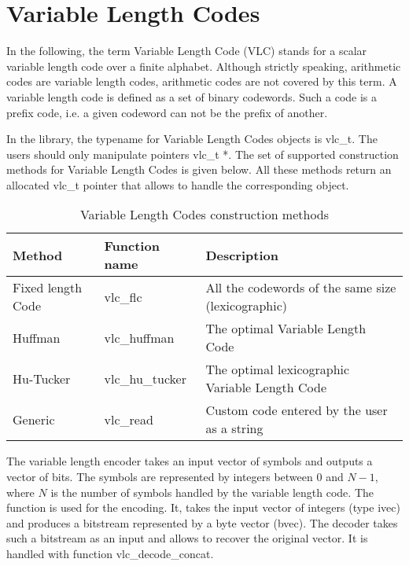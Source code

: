 \section{Variable Length Codes}

In the following, the term Variable Length Code (VLC)
stands for a scalar variable length code over a finite alphabet. 
Although strictly speaking, arithmetic codes are 
variable length codes, arithmetic codes are not covered by this term. 
A variable length code is defined as a set of binary codewords.  
Such a code is a prefix code, i.e. a given codeword can not be 
the prefix of another.  

In the library, the typename for Variable Length Codes objects is vlc\_t. 
The users should only manipulate pointers vlc\_t *. 
The set of supported construction methods for Variable Length Codes is
given below. All these methods return an allocated vlc\_t pointer 
that allows to handle the corresponding object. 


\begin{table}
\begin{center}
\begin{tabular}{|p{3.5cm}p{3cm}p{8.5cm}|}
\hline
       Method & 
       Function name & 
       Description \\
\hline 

          Fixed length Code & 
          vlc\_flc & 
          All the codewords of the same size (lexicographic) \\
          Huffman & 
          vlc\_huffman & 
          The optimal Variable Length Code \\
          Hu-Tucker & 
          vlc\_hu\_tucker & 
          The optimal lexicographic Variable Length Code \\
          Generic & 
          vlc\_read & 
          Custom code entered by the user as a string \\
\hline
\end{tabular}
\label{tab:vlcconstruction}
\caption{Variable Length Codes construction methods}
\end{center}
\end{table}


The variable length encoder takes an input vector of symbols and
outputs a vector of bits. The symbols are represented by integers
between $0$ and $N-1$, where $N$ is the number of symbols handled by the
variable length code. The function
 is used for the encoding. It,
takes the input vector of integers (type ivec) and produces a
bitstream represented by a byte vector (bvec). The decoder takes such
a bitstream as an input and allows to recover the original vector. It
is handled with function vlc\_decode\_concat.

